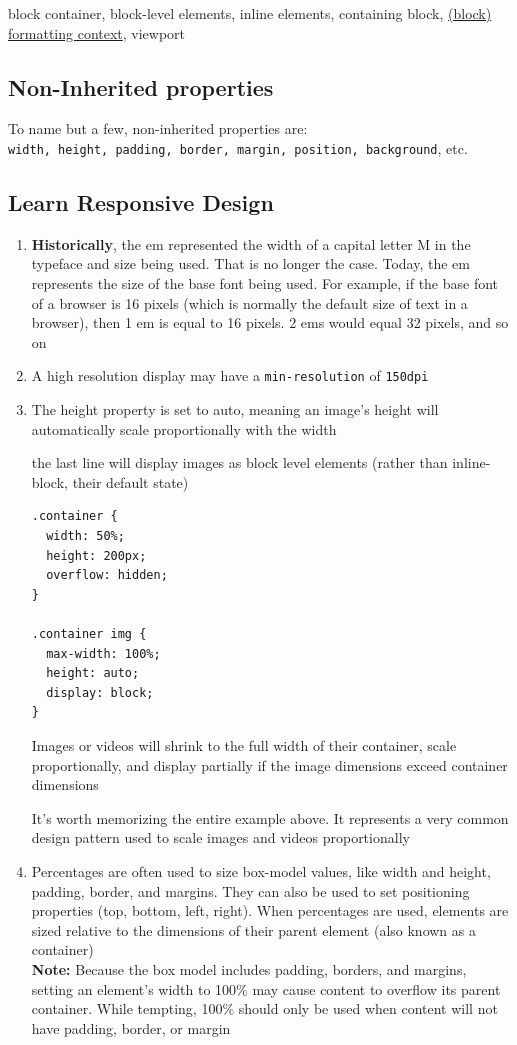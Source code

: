 \documentclass[a4paper, 12pt]{article}
\begin{document}
block container, block-level elements, inline elements, containing block, \href{https://developer.mozilla.org/en-US/docs/Web/Guide/CSS/Block_formatting_context}{(block) formatting context}, viewport

\subsection{Non-Inherited properties}
To name but a few, non-inherited properties are:\\ \verb|width, height, padding, border, margin, position, background|, etc.

\subsection{Learn Responsive Design}
\begin{enumerate}
\item \textbf{Historically}, the em represented the width of a capital letter M in the typeface and size being used. That is no longer the case. Today, the em represents the size of the base font being used. For example, if the base font of a browser is 16 pixels (which is normally the default size of text in a browser), then 1 em is equal to 16 pixels. 2 ems would equal 32 pixels, and so on

\item A high resolution display may have a \verb|min-resolution| of \verb|150dpi|

\item The height property is set to auto, meaning an image's height will automatically scale proportionally with the width

the last line will display images as block level elements (rather than inline-block, their default state)
\begin{verbatim}
.container {
  width: 50%;
  height: 200px;
  overflow: hidden;
}

.container img {
  max-width: 100%;
  height: auto;
  display: block;
}
\end{verbatim}
Images or videos  will shrink to the full width of their container, scale proportionally, and display partially if the image dimensions exceed container dimensions

It's worth memorizing the entire example above. It represents a very common design pattern used to scale images and videos proportionally

\item Percentages are often used to size box-model values, like width and height, padding, border, and margins. They can also be used to set positioning properties (top, bottom, left, right). When percentages are used, elements are sized relative to the dimensions of their parent element (also known as a container) \label{position}\\
\textbf{Note:} Because the box model includes padding, borders, and margins, setting an element's width to 100\% may cause content to overflow its parent container. While tempting, 100\% should only be used when content will not have padding, border, or margin


\end{enumerate}
\end{document}
